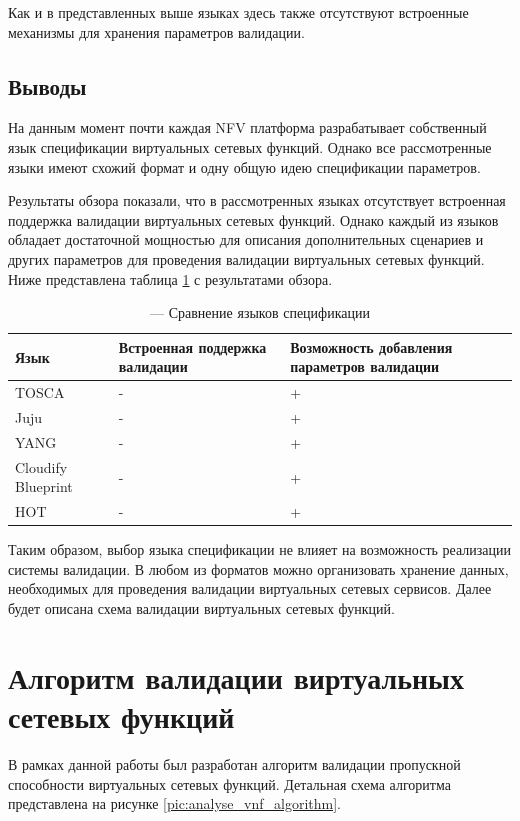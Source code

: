 \documentclass[oneside,final,14pt,a4paper]{extreport}
\begin{document}
Как и в представленных выше языках здесь также отсутствуют встроенные механизмы для хранения параметров валидации.


\subsection{Выводы}
На данным момент почти каждая NFV платформа разрабатывает собственный язык спецификации виртуальных сетевых функций. Однако все рассмотренные языки имеют схожий формат и одну общую идею спецификации параметров. 

Результаты обзора показали, что в рассмотренных языках отсутствует встроенная поддержка валидации виртуальных сетевых функций. Однако каждый из языков обладает достаточной мощностью для описания дополнительных сценариев и других параметров для проведения валидации виртуальных сетевых функций. Ниже представлена таблица \ref{tab:language-overview} с результатами обзора.

\renewcommand{\arraystretch}{1.5}
\begin{table}[h]
\center %
\begin{tabular}{|p{}|p{}|p{}|} %
\hline %
Язык & Встроенная поддержка валидации & Возможность добавления параметров валидации \\
\hline
TOSCA & - & + \\
\hline
Juju & - & + \\
\hline
YANG & - & + \\
\hline
Cloudify Blueprint & - & + \\
\hline
HOT & - & + \\
\hline
\end{tabular}
\caption{--- Сравнение языков спецификации}
\label{tab:language-overview}
\end{table}

Таким образом, выбор языка спецификации не влияет на возможность реализации системы валидации. В любом из форматов можно организовать хранение данных, необходимых для проведения валидации виртуальных сетевых сервисов. Далее будет описана схема валидации виртуальных сетевых функций.


\section{Алгоритм валидации виртуальных сетевых функций}
\label{sec:vnf-validation-algotihm}
В рамках данной работы был разработан алгоритм валидации пропускной способности виртуальных сетевых функций. Детальная схема алгоритма представлена на рисунке \ref{pic:analyse_vnf_algorithm}.
\end{document}
